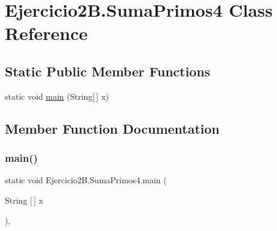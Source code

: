 \hypertarget{class_ejercicio2_b_1_1_suma_primos4}{}\section{Ejercicio2\+B.\+Suma\+Primos4 Class Reference}
\label{class_ejercicio2_b_1_1_suma_primos4}
\subsection*{Static Public Member Functions}
\begin{DoxyCompactItemize}
\item 
static void \mbox{\hyperlink{class_ejercicio2_b_1_1_suma_primos4_ab7017ea13a5f7ec26f2720fb33e1c31c}{main}} (String\mbox{[}$\,$\mbox{]} x)
\end{DoxyCompactItemize}


\subsection{Member Function Documentation}
\mbox{\label{class_ejercicio2_b_1_1_suma_primos4_ab7017ea13a5f7ec26f2720fb33e1c31c}} 
\subsubsection{\texorpdfstring{main()}{main()}}
{\footnotesize\ttfamily static void Ejercicio2\+B.\+Suma\+Primos4.\+main (\begin{DoxyParamCaption}\item[{String \mbox{[}$\,$\mbox{]}}]{x }\end{DoxyParamCaption})\hspace{0.3cm}{\ttfamily [inline]}, {\ttfamily [static]}}


